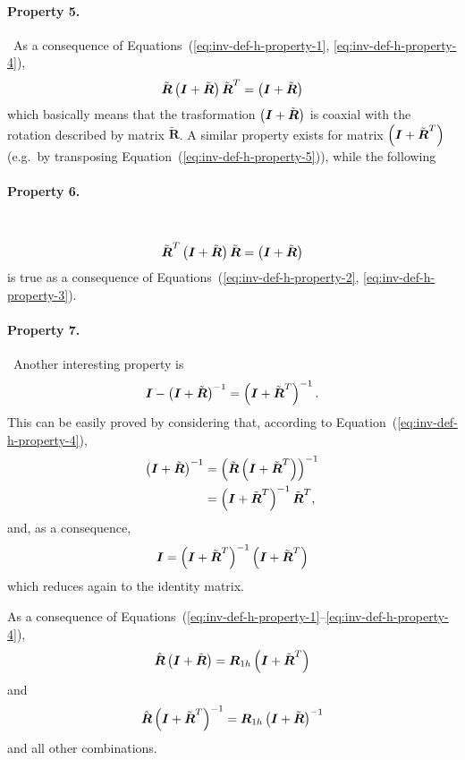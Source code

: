\documentclass[10pt,dvips,fleqn]{report}
\newcommand{\T}[1]{\boldsymbol{#1}}
\begin{document}
\paragraph{Property 5.} \
As a consequence
of Equations~(\ref{eq:inv-def-h-property-1}, \ref{eq:inv-def-h-property-4}),
\begin{equation}
	\tilde{\T{R}} \plbr{\T{I} + \tilde{\T{R}}} \tilde{\T{R}}^T = \plbr{\T{I} + \tilde{\T{R}}}
	\label{eq:inv-def-h-property-5}
\end{equation}
which basically means that the trasformation $\plbr{\T{I} + \tilde{\T{R}}}$
is coaxial with the rotation described by matrix $\tilde{\T{R}}$.
A similar property exists for matrix $\plbr{\T{I} + \tilde{\T{R}}^T}$
(e.g.\ by transposing Equation~(\ref{eq:inv-def-h-property-5})),
while the following

\paragraph{Property 6.} \
\begin{equation}
	\tilde{\T{R}}^T \plbr{\T{I} + \tilde{\T{R}}} \tilde{\T{R}} = \plbr{\T{I} + \tilde{\T{R}}}
	\label{eq:inv-def-h-property-6}
\end{equation}
is true as a consequence
of Equations~(\ref{eq:inv-def-h-property-2}, \ref{eq:inv-def-h-property-3}).

\paragraph{Property 7.} \
Another interesting property is
\begin{equation}
	\T{I} - \plbr{\T{I} + \tilde{\T{R}}}^{-1} = \plbr{\T{I} + \tilde{\T{R}}^T}^{-1} .
	\label{eq:inv-def-h-property-7}
\end{equation}
This can be easily proved by considering that,
according to Equation~(\ref{eq:inv-def-h-property-4}),
\begin{align}
	\plbr{\T{I} + \tilde{\T{R}}}^{-1}
	&= \plbr{\tilde{\T{R}}\plbr{\T{I} + \tilde{\T{R}}^T}}^{-1} \\
	&= \plbr{\T{I} + \tilde{\T{R}}^T}^{-1} \tilde{\T{R}}^T ,
\end{align}
and, as a consequence,
\begin{equation}
	\T{I} = \plbr{\T{I} + \tilde{\T{R}}^T}^{-1} \plbr{\T{I} + \tilde{\T{R}}^T}
\end{equation}
which reduces again to the identity matrix.

As a consequence
of Equations~(\ref{eq:inv-def-h-property-1}--\ref{eq:inv-def-h-property-4}),
\begin{equation}
	\hat{\T{R}} \plbr{\T{I} + \tilde{\T{R}}} 
	= \T{R}_{1h} \plbr{\T{I} + \tilde{\T{R}}^T}
\end{equation}
and
\begin{equation}
	\hat{\T{R}} \plbr{\T{I} + \tilde{\T{R}}^T}^{-1}
	= \T{R}_{1h} \plbr{\T{I} + \tilde{\T{R}}}^{-1}
\end{equation}
and all other combinations.
\end{document}
